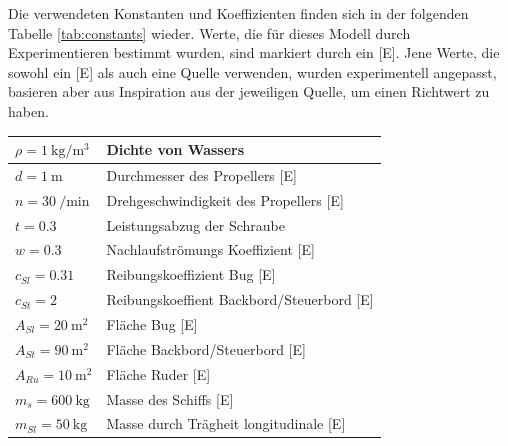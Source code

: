 \documentclass[]{iat}
\begin{document}
Die verwendeten Konstanten und Koeffizienten finden sich in der folgenden Tabelle \ref{tab:constants} wieder. Werte, die für dieses Modell durch Experimentieren bestimmt wurden, sind markiert durch ein [E]. Jene Werte, die sowohl ein [E] als auch eine Quelle verwenden, wurden experimentell angepasst, basieren aber aus Inspiration aus der jeweiligen Quelle, um einen Richtwert zu haben.
\begin{table}[H]
    \begin{tabular}{l|l}
        $\rho = \SI{1}{\kg\per\cubic\m}$ & Dichte von Wassers                                                                 \\ \hline
        $d = \SI{1}{\m}$                 & Durchmesser des Propellers [E]                                                     \\ \hline
        $n = \SI{30}{\per\minute}$       & Drehgeschwindigkeit des Propellers [E]                                             \\ \hline
        $t = 0.3$                        & Leistungsabzug der Schraube \cite[]{Zelazny_2014} \cite[]{Kulczyk_Tabaczek_2014_2} \\ \hline
        $w = 0.3$                        & Nachlaufströmungs Koeffizient [E] \cite[]{Zelazny_2014}                            \\ \hline
        $c_{Sl} = 0.31$                  & Reibungskoeffizient Bug [E]                                                        \\ \hline
        $c_{St} = 2$                     & Reibungskoeffient Backbord/Steuerbord [E]                                          \\ \hline
        $A_{Sl} = \SI{20}{\m\squared}$   & Fläche Bug [E]                                                                     \\ \hline
        $A_{St} = \SI{90}{\m\squared}$   & Fläche Backbord/Steuerbord [E]                                                     \\ \hline
        $A_{Ru} = \SI{10}{\m\squared}$   & Fläche Ruder [E]                                                                   \\ \hline
        $m_s = \SI{600}{\kg}$            & Masse des Schiffs [E]                                                              \\ \hline
        $m_{Sl} = \SI{50}{\kg}$          & Masse durch Trägheit longitudinale [E]                                             \\ \hline

\end{tabular}
\end{table}
\end{document}
